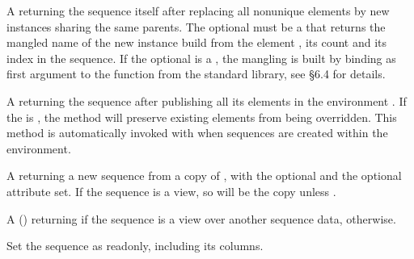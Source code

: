 \documentclass[letterpaper,10pt,english]{sphinxmanual}
\begin{document}
\begin{description}
\sphinxAtStartPar
A  \sphinxcode{\sphinxupquote{({[}fmt{]})}} returning the sequence itself after replacing all non\sphinxhyphen{}unique elements by new instances sharing the same parents.
The optional  must be a   that returns the mangled name of the new instance build from the element ,
its count  and its index  in the sequence. If the optional  is a , the mangling  is built by binding 
as first argument to the function  from the standard library, see
 \S{}6.4 for details.

\sphinxAtStartPar
A   returning the sequence after publishing all its elements in the environment . If the   is
, the method will preserve existing elements from being overridden. This method is automatically invoked with  when sequences
are created within the  environment.

\sphinxAtStartPar
A  \sphinxcode{\sphinxupquote{({[}name{]}, {[}owner{]})}} returning a new sequence from a copy of , with the optional  and the optional attribute  set.
If the sequence is a view, so will be the copy unless .

\sphinxAtStartPar
A  () returning  if the sequence is a view over another sequence data,  otherwise.

\sphinxAtStartPar
Set the sequence as read\sphinxhyphen{}only, including its columns.


\end{description}
\end{document}
